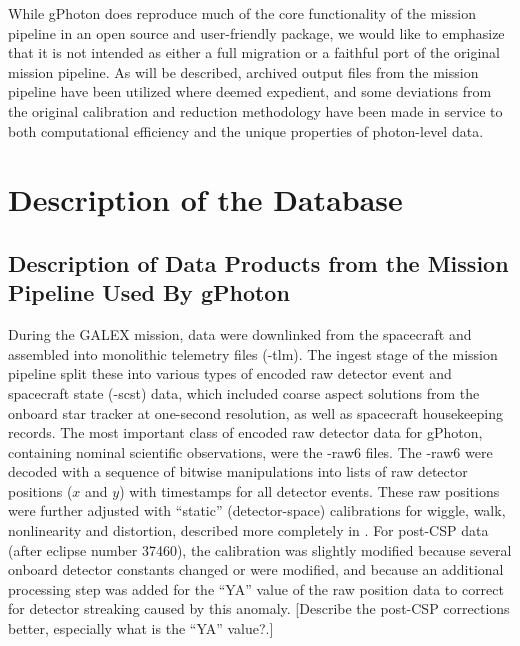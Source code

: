 \documentclass[5p]{elsarticle}
\begin{document}
While gPhoton does reproduce much of the core functionality of the mission pipeline in an open source and user-friendly package, we would like to emphasize that it is not intended as either a full migration or a faithful port of the original mission pipeline. As will be described, archived output files from the mission pipeline have been utilized where deemed expedient, and some deviations from the original calibration and reduction methodology have been made in service to both computational efficiency and the unique properties of photon-level data.

\section{Description of the Database}
\label{database}
\subsection{Description of Data Products from the Mission Pipeline Used By gPhoton}
During the GALEX mission, data were downlinked from the spacecraft and assembled into monolithic telemetry files (-tlm). The ingest stage of the mission pipeline split these into various types of encoded raw detector event and spacecraft state (-scst) data, which included coarse aspect solutions from the onboard star tracker at one-second resolution, as well as spacecraft housekeeping records. The most important class of encoded raw detector data for gPhoton, containing nominal scientific observations, were the -raw6 files. The -raw6 were decoded with a sequence of bitwise manipulations into lists of raw detector positions ($x$ and $y$) with timestamps for all detector events. These raw positions were further adjusted with ``static'' (detector-space) calibrations for wiggle, walk, nonlinearity and distortion, described more completely in \citet{mor2007}. For post-CSP data (after eclipse number 37460), the calibration was slightly modified because several onboard detector constants changed or were modified, and because an additional processing step was added for the “YA” value of the raw position data to correct for detector streaking caused by this anomaly. {\color{red}[Describe the post-CSP corrections better, especially what is the ``YA'' value?.]}
\end{document}
